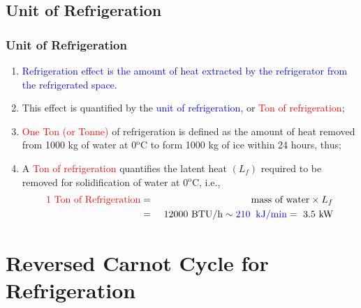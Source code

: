 \documentclass[10pt,compress]{beamer}
\begin{document}
\subsection{Unit of Refrigeration}
\begin{frame}
 \frametitle{Unit of Refrigeration}
 \begin{enumerate}[(1)]\scriptsize
  \item <1-> \textcolor{blue}{Refrigeration effect is the amount of heat extracted by the refrigerator from the refrigerated space.}
  \item <2-> This effect is quantified by the \textcolor{blue}{unit of refrigeration}, or \textcolor{red}{Ton of refrigeration};
  \item <3-> \textcolor{red}{One Ton (or Tonne)} of refrigeration is defined as the amount of heat removed from 1000 kg of water at 0$^{\text{o}}$C to form 1000 kg of ice within 24 hours, thus;
  \item <4-> A \textcolor{red}{Ton of refrigeration} quantifies the latent heat $\left(L_{f}\right)$ required to be removed for solidification of water at 0$^{\text{o}}$C, i.e.,
   \begin{eqnarray}
    \textcolor{red}{\text{1 Ton of Refrigeration}} &=& \text{mass of water} \times L_{f} \nonumber \\
                                                   &=& \text{ 12000 BTU/h} \sim \textcolor{blue}{210\;\; \text{kJ/min}} = \text{ 3.5 kW}\nonumber 
   \end{eqnarray}
 \end{enumerate}
\end{frame}



\section{Reversed Carnot Cycle for Refrigeration}
\end{document}
